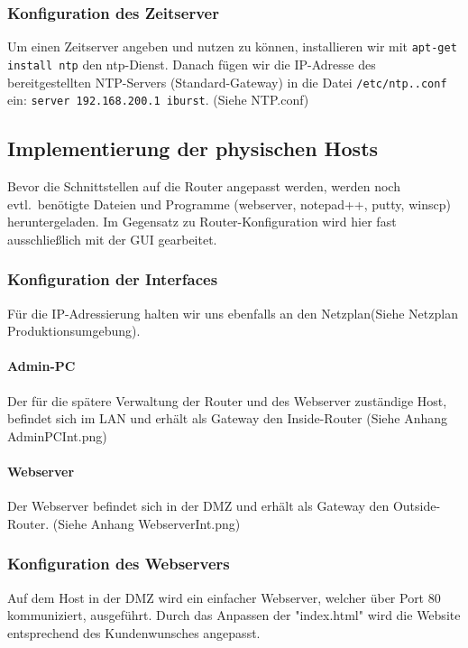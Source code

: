 \subsubsection{Konfiguration des Zeitserver}
\label{subsubsec:KonfigurationLinuxNTP}
Um einen Zeitserver angeben und nutzen zu können, installieren wir mit \verb+apt-get install ntp+ den ntp-Dienst. Danach fügen wir die IP-Adresse des bereitgestellten NTP-Servers (Standard-Gateway) in die Datei \verb+/etc/ntp..conf+ ein: \verb+server 192.168.200.1 iburst+. (Siehe NTP.conf)



\subsection{Implementierung der physischen Hosts}
\label{subsec:ImplementierungHosts}
Bevor die Schnittstellen auf die Router angepasst werden, werden noch evtl.\ benötigte Dateien und Programme (webserver, notepad++, putty, winscp) heruntergeladen. Im Gegensatz zu Router-Konfiguration wird hier fast ausschließlich mit der GUI gearbeitet.

\subsubsection{Konfiguration der Interfaces}
\label{subsubsec:KonfigurationHostInt}
Für die IP-Adressierung halten wir uns ebenfalls an den Netzplan(Siehe Netzplan Produktionsumgebung).

\paragraph*{Admin-PC} Der für die spätere Verwaltung der Router und des Webserver zuständige Host, befindet sich im LAN und erhält als Gateway den Inside-Router (Siehe Anhang AdminPCInt.png)

\paragraph*{Webserver} Der Webserver befindet sich in der DMZ und erhält als Gateway den Outside-Router. (Siehe Anhang WebserverInt.png)

\subsubsection{Konfiguration des Webservers}
\label{subsubsec:KonfigurationWebserver}
Auf dem Host in der DMZ wird ein einfacher Webserver, welcher über Port 80 kommuniziert, ausgeführt. Durch das Anpassen der "index.html" wird die Website entsprechend des Kundenwunsches angepasst.

